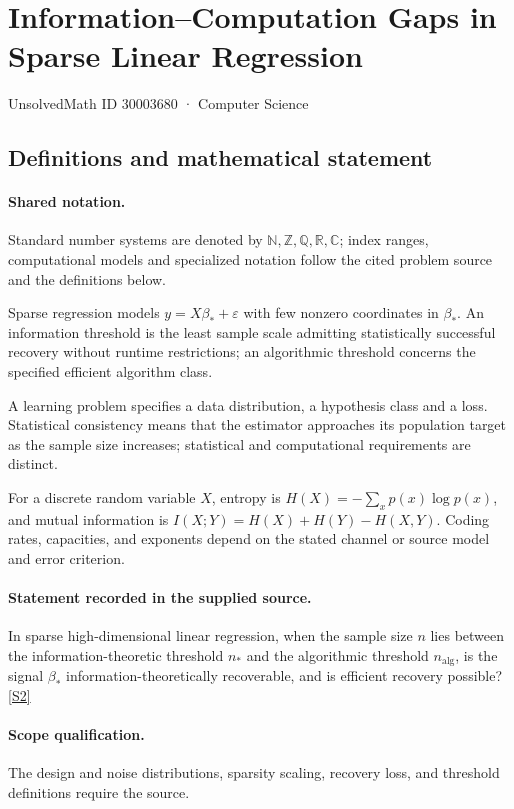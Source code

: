 \documentclass[11pt]{article}
\newcommand{\sref}[2]{\hyperlink{source:#1:#2}{[S#2]}}
\begin{document}
\setcounter{section}{30003679}
\section{Information–Computation Gaps in Sparse Linear Regression}\label{30003680}
{\small\sffamily UnsolvedMath ID 30003680 · Computer Science}
\subsection{Definitions and mathematical statement}

\paragraph{Shared notation.}Standard number systems are denoted by $\mathbb N,\mathbb Z,\mathbb Q,\mathbb R,\mathbb C$; index ranges, computational models and specialized notation follow the cited problem source and the definitions below.


Sparse regression models $y=X\beta_*+\varepsilon$ with few nonzero coordinates in $\beta_*$. An information threshold is the least sample scale admitting statistically successful recovery without runtime restrictions; an algorithmic threshold concerns the specified efficient algorithm class.

A learning problem specifies a data distribution, a hypothesis class and a loss. Statistical consistency means that the estimator approaches its population target as the sample size increases; statistical and computational requirements are distinct.

For a discrete random variable $X$, entropy is $H(X)=-\sum_xp(x)\log p(x)$, and mutual information is $I(X;Y)=H(X)+H(Y)-H(X,Y)$. Coding rates, capacities, and exponents depend on the stated channel or source model and error criterion.
\paragraph{Statement recorded in the supplied source.}
In sparse high-dimensional linear regression, when the sample size $n$ lies between the information-theoretic threshold $n_*$ and the algorithmic threshold $n_{\mathrm{alg}}$, is the signal $\beta_*$ information-theoretically recoverable, and is efficient recovery possible? \sref{30003680}{2}
\paragraph{Scope qualification.}
The design and noise distributions, sparsity scaling, recovery loss, and threshold definitions require the source.
\end{document}
